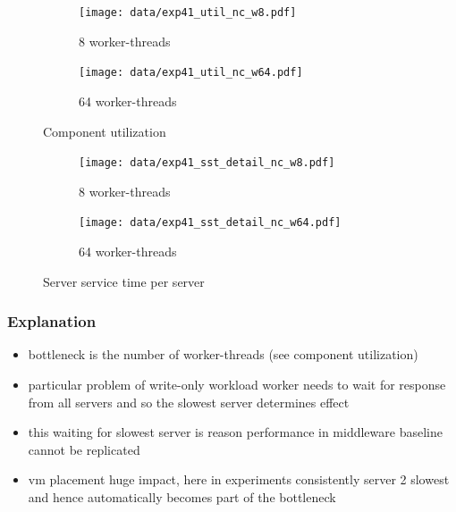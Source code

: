 \documentclass[11pt,a4paper]{article}
\begin{document}
\begin{figure}
	\begin{subfigure}[b]{.49\linewidth}
		\centering
		\texttt{[image: data/exp41\_util\_nc\_w8.pdf]}
		\caption{8 worker-threads}
	\end{subfigure}\hfill
	\begin{subfigure}[b]{.49\linewidth}
		\centering
		\texttt{[image: data/exp41\_util\_nc\_w64.pdf]}
		\caption{64 worker-threads}
	\end{subfigure}%
	\caption{Component utilization}\label{exp41_util_nc}
\end{figure}


\begin{figure}
	\begin{subfigure}[b]{.49\linewidth}
		\centering
		\texttt{[image: data/exp41\_sst\_detail\_nc\_w8.pdf]}
		\caption{8 worker-threads}
	\end{subfigure}\hfill
	\begin{subfigure}[b]{.49\linewidth}
		\centering
		\texttt{[image: data/exp41\_sst\_detail\_nc\_w64.pdf]}
		\caption{64 worker-threads}
	\end{subfigure}%
	\caption{Server service time per server}\label{exp41_sst_detail_nc}
\end{figure}



\subsubsection{Explanation}


\begin{itemize}
	\item bottleneck is the number of worker-threads (see component utilization)
	\item particular problem of write-only workload worker needs to wait for response from all servers and so the slowest server determines effect
	\item this waiting for slowest server is reason performance in middleware baseline cannot be replicated
	\item vm placement huge impact, here in experiments consistently server 2 slowest and hence automatically becomes part of the bottleneck
\end{itemize}
\end{document}
